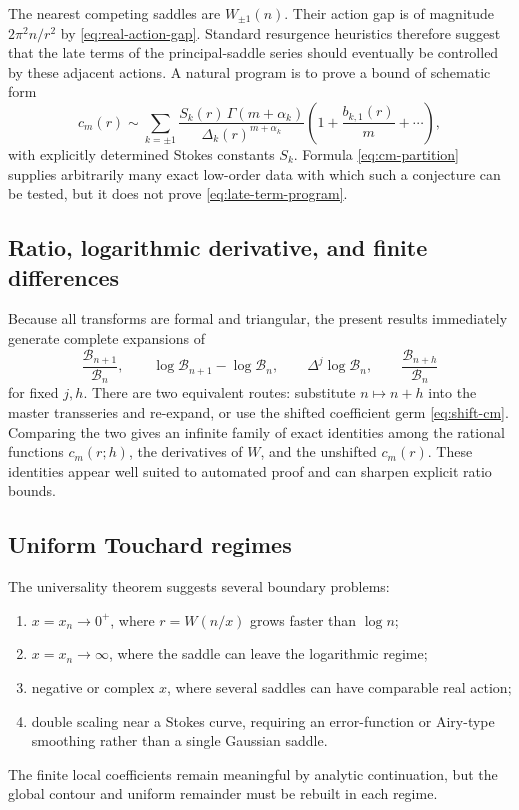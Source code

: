 \documentclass[11pt,a4paper]{article}
\theoremstyle{definition}
\theoremstyle{remark}
\newcommand{\Bell}{\mathcal B}
\begin{document}
The nearest competing saddles are \(W_{\pm1}(n)\).  Their action gap is of
magnitude \(2\pi^2n/r^2\) by \cref{eq:real-action-gap}.  Standard resurgence
heuristics therefore suggest that the late terms of the principal-saddle
series should eventually be controlled by these adjacent actions.  A natural
program is to prove a bound of schematic form
\begin{equation}\label{eq:late-term-program}
 c_m(r)\sim
 \sum_{k=\pm1}
 \frac{S_k(r)\,\Gamma(m+\alpha_k)}{\Delta_k(r)^{m+\alpha_k}}
 \left(1+\frac{b_{k,1}(r)}m+\cdots\right),
\end{equation}
with explicitly determined Stokes constants \(S_k\).  Formula
\cref{eq:cm-partition} supplies arbitrarily many exact low-order data with
which such a conjecture can be tested, but it does not prove
\cref{eq:late-term-program}.

\subsection{Ratio, logarithmic derivative, and finite differences}

Because all transforms are formal and triangular, the present results
immediately generate complete expansions of
\begin{equation}\label{eq:derived-observables}
 \frac{\Bell_{n+1}}{\Bell_n},
 \qquad
 \log\Bell_{n+1}-\log\Bell_n,
 \qquad
 \Delta^j\log\Bell_n,
 \qquad
 \frac{\Bell_{n+h}}{\Bell_n}
\end{equation}
for fixed \(j,h\).  There are two equivalent routes: substitute
\(n\mapsto n+h\) into the master transseries and re-expand, or use the shifted
coefficient germ \cref{eq:shift-cm}.  Comparing the two gives an infinite
family of exact identities among the rational functions \(c_m(r;h)\), the
derivatives of \(W\), and the unshifted \(c_m(r)\).  These identities appear
well suited to automated proof and can sharpen explicit ratio bounds.

\subsection{Uniform Touchard regimes}

The universality theorem suggests several boundary problems:
\begin{enumerate}[label=(\roman*),leftmargin=2.2em,itemsep=2pt]
 \item \(x=x_n\to0^+\), where \(r=W(n/x)\) grows faster than \(\log n\);
 \item \(x=x_n\to\infty\), where the saddle can leave the logarithmic regime;
 \item negative or complex \(x\), where several saddles can have comparable
       real action;
 \item double scaling near a Stokes curve, requiring an error-function or
       Airy-type smoothing rather than a single Gaussian saddle.
\end{enumerate}
The finite local coefficients remain meaningful by analytic continuation, but
the global contour and uniform remainder must be rebuilt in each regime.
\end{document}
